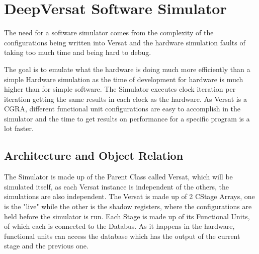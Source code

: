 \documentclass[conference]{IEEEtran}
\begin{document}
% 




\section{DeepVersat Software Simulator}
\label{chapter:Simulator}

The need for a software simulator comes from the complexity of the configurations 
being written into Versat and the hardware simulation faults of taking too much time and being hard to debug.

The goal is to emulate what the hardware is doing much more efficiently than 
a simple Hardware simulation as the time of development for hardware
is much higher than for simple software. The Simulator executes clock iteration per iteration 
getting the same results in each clock as the hardware. 
As Versat is a CGRA, different functional unit configurations are easy to accomplish 
in the simulator and the time to get results on performance
for a specific program is a lot faster. 





\subsection{Architecture and Object Relation}

The Simulator is made up of the Parent Class called Versat, which will be simulated itself, 
as each Versat instance is independent of the others, the simulations are also independent.
The Versat is made up of 2 CStage Arrays, one is the "live" while the other is the 
shadow registers, where the configurations are held before the simulator is run.
Each Stage is made up of its Functional Units, of which each is connected to the Databus.
As it happens in the hardware, functional units can access the database which has the output 
of the current stage and the previous one.
\end{document}

